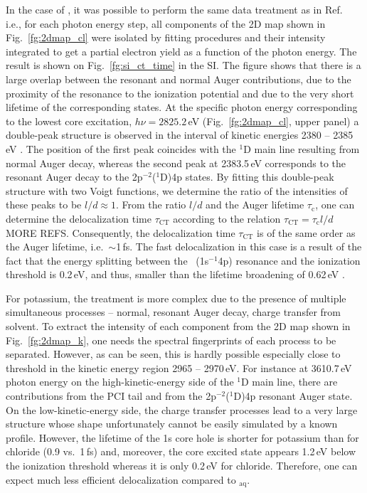 In the case of \cli, it was possible to perform the same data treatment as in Ref.\ \cite{ceolin15:022502} i.e., for each photon energy step, all components of the 2D map shown in Fig.\ \ref{fg:2dmap_cl} were isolated by fitting procedures and their intensity integrated to get a partial electron yield as a function of the photon energy. The result is shown on Fig.\ \ref{fg:si_ct_time} in the SI. The figure shows that there is a large overlap between the resonant and normal Auger contributions, due to the proximity of the resonance to the ionization potential and due to the very short lifetime of the corresponding states. At the specific photon energy corresponding to the lowest core excitation, $h\nu = 2825.2$\,eV (Fig.\ \ref{fg:2dmap_cl}, upper panel) a double-peak structure is observed in the interval of kinetic energies 2380 -- 2385\,eV . The position of the first peak coincides with the $^1$D main line resulting from normal Auger decay, whereas the second peak at 2383.5\,eV corresponds to the resonant Auger decay to the 2p$^{-2}$($^1$D)4p states. By fitting this double-peak structure with two Voigt functions, we determine the ratio of the intensities of these peaks to be $l/d \approx 1$. From the ratio $l/d$ and the Auger lifetime $\tau_{\text{c}}$, one can determine the delocalization time $\tau_{\text{CT}}$ according to the relation $\tau_{\text{CT}} = \tau_{\text{c}}l/d$ \citep{foehlisch05:373}{\color{red}MORE REFS}. Consequently, the delocalization time $\tau_{\text{CT}}$ is of the same order as the Auger lifetime, i.e.\ $\sim$1\,fs. The fast delocalization in this case is a result of the fact that the energy splitting between the \cli~(1s$^{-1}$4p) resonance and the ionization threshold is 0.2\,eV, and thus, smaller than the lifetime broadening of 0.62\,eV \citep{ceolin17:263003}.


For potassium, the treatment is more complex due to the presence of multiple simultaneous processes -- normal, resonant Auger decay, charge transfer from solvent. To extract the intensity of each component from the 2D map shown in Fig.\ \ref{fg:2dmap_k}, one needs the spectral fingerprints of each process to be separated. However, as can be seen, this is hardly possible especially close to threshold in the kinetic energy region 2965 -- 2970\,eV. For instance at 3610.7\,eV photon energy on the high-kinetic-energy side of the $^1$D main line, there are contributions from the PCI tail and from the 2p$^{-2}$($^1$D)4p resonant Auger state. On the low-kinetic-energy side, the charge transfer processes lead to a very large structure whose shape unfortunately cannot be easily simulated by a known profile. However, the lifetime of the 1s core hole is shorter for potassium than for chloride (0.9 vs.\ 1\,fs) and, moreover, the core excited state appears 1.2\,eV below the ionization threshold whereas it is only 0.2\,eV for chloride. Therefore, one can expect much less efficient delocalization compared to \cli$_{\text{aq}}$.